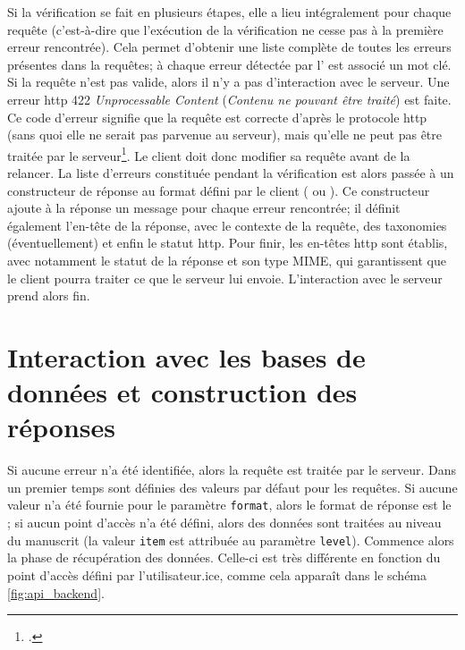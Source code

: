 Si la vérification se fait en plusieurs étapes, elle a lieu intégralement pour chaque requête (c'est-à-dire que l'exécution de la vérification ne cesse pas à la première erreur rencontrée). Cela permet d'obtenir une liste complète de toutes les erreurs présentes dans la requêtes; à chaque erreur détectée par l'\api{} est associé un mot clé. Si la requête n'est pas valide, alors il n'y a pas d'interaction avec le serveur. Une erreur \gls{http} 422 \textit{Unprocessable Content} (\textit{Contenu ne pouvant être traité}) est faite. Ce code d'erreur signifie que la requête est correcte d'après le protocole \gls{http} (sans quoi elle ne serait pas parvenue au serveur), mais qu'elle ne peut pas être traitée par le serveur\footcite[§15.5.21. \textit{422 Unprocessable Content}]{fielding_http_2022}. Le client doit donc modifier sa requête avant de la relancer. La liste d'erreurs constituée pendant la vérification est alors passée à un constructeur de réponse au format défini par le client (\json{} ou \tei{}). Ce constructeur ajoute à la réponse un message pour chaque erreur rencontrée; il définit également l'en-tête de la réponse, avec le contexte de la requête, des taxonomies (éventuellement) et enfin le statut \gls{http}. Pour finir, les en-têtes \gls{http} sont établis, avec notamment le statut de la réponse et son type MIME, qui garantissent que le client pourra traiter ce que le serveur lui envoie. L'interaction avec le serveur prend alors fin.

\section{Interaction avec les bases de données et construction des réponses}
Si aucune erreur n'a été identifiée, alors la requête est traitée par le serveur. Dans un premier temps sont définies des valeurs par défaut pour les requêtes. Si aucune valeur n'a été fournie pour le paramètre \texttt{format}, alors le format de réponse est le \json{}; si aucun point d'accès n'a été défini, alors des données sont traitées au niveau du manuscrit (la valeur \texttt{item} est attribuée au paramètre \texttt{level}). Commence alors la phase de récupération des données. Celle-ci est très différente en fonction du point d'accès défini par l'utilisateur.ice, comme cela apparaît dans le schéma \ref{fig:api_backend}.

